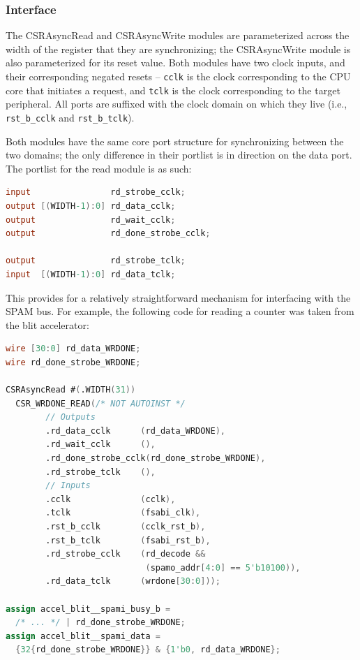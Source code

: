 \documentclass[10pt]{report}
\begin{document}
\subsubsection{Interface}

The CSRAsyncRead and CSRAsyncWrite modules are parameterized across the
width of the register that they are synchronizing; the CSRAsyncWrite module
is also parameterized for its reset value.  Both modules have two clock
inputs, and their corresponding negated resets -- \texttt{cclk} is the clock
corresponding to the CPU core that initiates a request, and \texttt{tclk} is
the clock corresponding to the target peripheral.  All ports are suffixed
with the clock domain on which they live (i.e., \texttt{rst\_b\_cclk} and
\texttt{rst\_b\_tclk}).

Both modules have the same core port structure for synchronizing between the
two domains; the only difference in their portlist is in direction on the
data port. The portlist for the read module is as such:

\begin{lstlisting}[basicstyle=\footnotesize,language=Verilog]
input                rd_strobe_cclk;
output [(WIDTH-1):0] rd_data_cclk;
output               rd_wait_cclk;
output               rd_done_strobe_cclk;
 
output               rd_strobe_tclk;
input  [(WIDTH-1):0] rd_data_tclk;
\end{lstlisting}

This provides for a relatively straightforward mechanism for interfacing
with the SPAM bus. For example, the following code for reading a counter was
taken from the blit accelerator:

\begin{lstlisting}[basicstyle=\footnotesize,language=Verilog]
wire [30:0] rd_data_WRDONE;
wire rd_done_strobe_WRDONE;
 
CSRAsyncRead #(.WIDTH(31))
  CSR_WRDONE_READ(/* NOT AUTOINST */
        // Outputs
        .rd_data_cclk      (rd_data_WRDONE),
        .rd_wait_cclk      (),
        .rd_done_strobe_cclk(rd_done_strobe_WRDONE),
        .rd_strobe_tclk    (),
        // Inputs
        .cclk              (cclk),
        .tclk              (fsabi_clk),
        .rst_b_cclk        (cclk_rst_b),
        .rst_b_tclk        (fsabi_rst_b),
        .rd_strobe_cclk    (rd_decode &&
                            (spamo_addr[4:0] == 5'b10100)),
        .rd_data_tclk      (wrdone[30:0]));
 
assign accel_blit__spami_busy_b =
  /* ... */ | rd_done_strobe_WRDONE;
assign accel_blit__spami_data =
  {32{rd_done_strobe_WRDONE}} & {1'b0, rd_data_WRDONE};
\end{lstlisting}
\end{document}

